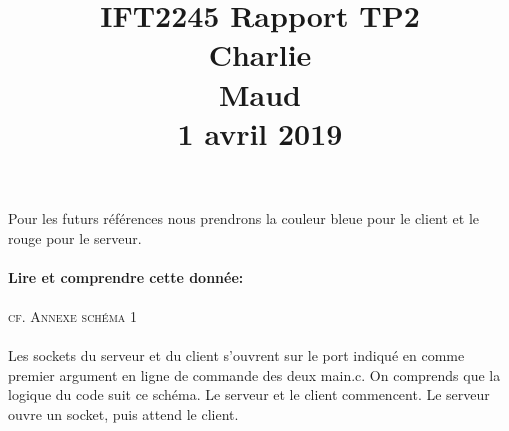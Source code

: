 \documentclass[11pt]{article}
\title{\vspace{\fill}\textbf{IFT2245 Rapport TP2}\\[\baselineskip] Charlie \bsc{Gauthier} \\ Maud \bsc{Moerel-Martini}\\[\baselineskip] 1 avril 2019\vspace{\fill}}
\date{}
\begin{document}
\maketitle
\newpage
Pour les futurs références nous prendrons la couleur bleue pour le client et le rouge pour le serveur.\\\\
\textbf{Lire et comprendre cette donnée:}
\\\\
\textsc{cf. Annexe schéma 1}
\\\\
Les sockets du serveur et du client s’ouvrent sur le port indiqué en comme premier argument en ligne de commande des deux main.c.
On comprends que la logique du code suit ce schéma. Le serveur et le client commencent. Le serveur ouvre un socket, puis attend le client.
\end{document}
